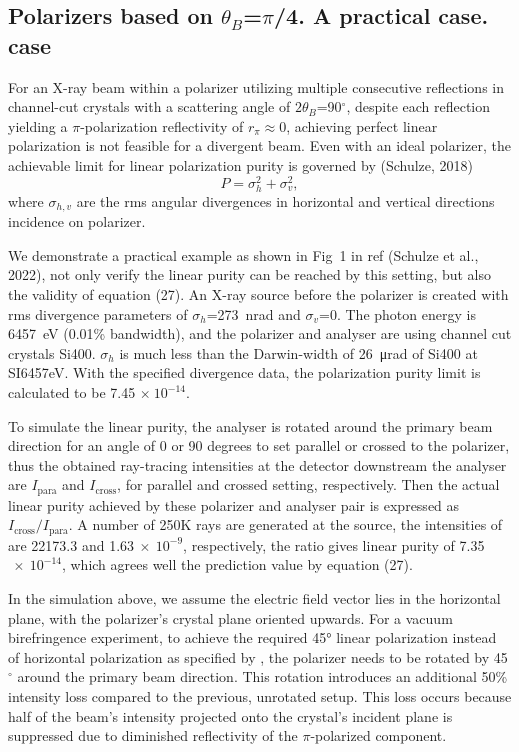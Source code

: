 \documentclass{iucr}
\begin{document}
\subsection{Polarizers based on $\theta_B$=$\pi$/4. A practical case. case}\label{sec:polarizers45degPractical}

For an X-ray beam within a polarizer utilizing multiple consecutive reflections in channel-cut crystals with a scattering angle of $2\theta_B$=90$^\circ$, despite each reflection yielding a $\pi$-polarization reflectivity of $r_\pi\approx 0$, achieving perfect linear polarization is not feasible for a divergent beam.
Even with an ideal polarizer, the achievable limit for linear polarization purity is governed by (Schulze, 2018)
\begin{equation}\label{eq:polarizer}
    P = \sigma_h^2 + \sigma_v^2,
\end{equation}
where $\sigma_{h,v}$ are the rms angular divergences in horizontal and vertical directions incidence on polarizer.

We demonstrate a practical example as shown in Fig~1 in ref (Schulze et al., 2022), not only verify the linear purity can be reached by this setting, but also the validity of equation (27).
An X-ray source before the polarizer is created with rms divergence parameters of $\sigma_h$=273~nrad and $\sigma_v$=0.
The photon energy is \SI{6457}{eV} (0.01\% bandwidth), and the polarizer and analyser are using channel cut crystals Si400.
$\sigma_h$ is much less than the Darwin-width of \SI{26}{\micro\radian} of Si400 at SI{6457}{eV}.
With the specified divergence data, the polarization purity limit is calculated to be 7.45 $\times~10^{-14}$.

To simulate the linear purity, the analyser is rotated around the primary beam direction for an angle of 0 or 90 degrees to set parallel or crossed to the polarizer, thus the obtained ray-tracing intensities at the detector downstream the analyser are $I_\text{para}$ and $I_\text{cross}$, for parallel and crossed setting, respectively.
Then the actual linear purity achieved by these polarizer and analyser pair is expressed as $I_\text{cross}/I_\text{para}$.
A number of 250K rays are generated at the source, the intensities of  are 22173.3 and 1.63$~\times~10^{-9}$, respectively, the ratio gives linear purity of 7.35$~\times~10^{-14}$, which agrees well the prediction value by equation (27).

In the simulation above, we assume the electric field vector lies in the horizontal plane, with the polarizer’s crystal plane oriented upwards.
For a vacuum birefringence experiment, to achieve the required 45° linear polarization instead of horizontal polarization as specified by \cite{Shen2018}, the polarizer needs to be rotated by 45$^\circ$ around the primary beam direction.
This rotation introduces an additional 50\% intensity loss compared to the previous, unrotated setup.
This loss occurs because half of the beam’s intensity projected onto the crystal’s incident plane is suppressed due to diminished reflectivity of the $\pi$-polarized component.
\end{document}
